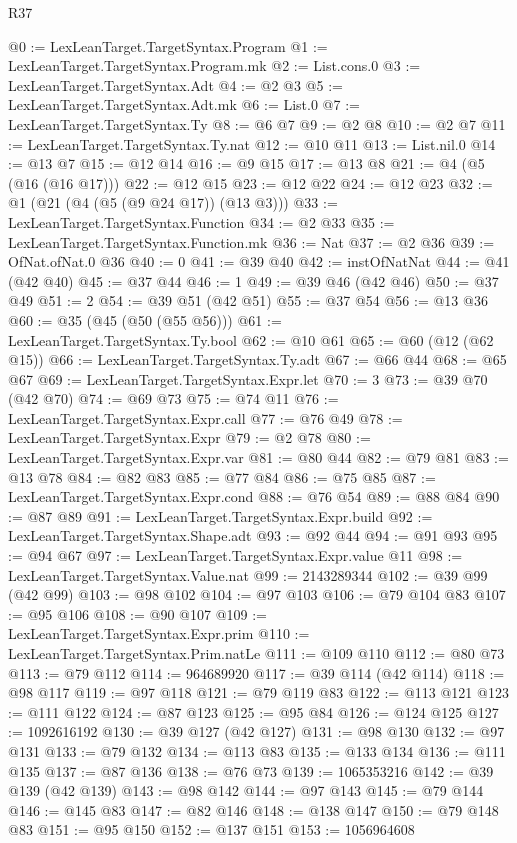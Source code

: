 \begin{lexlean}{R37}
\begin{coremodule}
@0 := LexLeanTarget.TargetSyntax.Program
@1 := LexLeanTarget.TargetSyntax.Program.mk
@2 := List.cons.{0}
@3 := LexLeanTarget.TargetSyntax.Adt
@4 := @2 @3
@5 := LexLeanTarget.TargetSyntax.Adt.mk
@6 := List.{0}
@7 := LexLeanTarget.TargetSyntax.Ty
@8 := @6 @7
@9 := @2 @8
@10 := @2 @7
@11 := LexLeanTarget.TargetSyntax.Ty.nat
@12 := @10 @11
@13 := List.nil.{0}
@14 := @13 @7
@15 := @12 @14
@16 := @9 @15
@17 := @13 @8
@21 := @4 (@5 (@16 (@16 @17)))
@22 := @12 @15
@23 := @12 @22
@24 := @12 @23
@32 := @1 (@21 (@4 (@5 (@9 @24 @17)) (@13 @3)))
@33 := LexLeanTarget.TargetSyntax.Function
@34 := @2 @33
@35 := LexLeanTarget.TargetSyntax.Function.mk
@36 := Nat
@37 := @2 @36
@39 := OfNat.ofNat.{0} @36
@40 := 0
@41 := @39 @40
@42 := instOfNatNat
@44 := @41 (@42 @40)
@45 := @37 @44
@46 := 1
@49 := @39 @46 (@42 @46)
@50 := @37 @49
@51 := 2
@54 := @39 @51 (@42 @51)
@55 := @37 @54
@56 := @13 @36
@60 := @35 (@45 (@50 (@55 @56)))
@61 := LexLeanTarget.TargetSyntax.Ty.bool
@62 := @10 @61
@65 := @60 (@12 (@62 @15))
@66 := LexLeanTarget.TargetSyntax.Ty.adt
@67 := @66 @44
@68 := @65 @67
@69 := LexLeanTarget.TargetSyntax.Expr.let
@70 := 3
@73 := @39 @70 (@42 @70)
@74 := @69 @73
@75 := @74 @11
@76 := LexLeanTarget.TargetSyntax.Expr.call
@77 := @76 @49
@78 := LexLeanTarget.TargetSyntax.Expr
@79 := @2 @78
@80 := LexLeanTarget.TargetSyntax.Expr.var
@81 := @80 @44
@82 := @79 @81
@83 := @13 @78
@84 := @82 @83
@85 := @77 @84
@86 := @75 @85
@87 := LexLeanTarget.TargetSyntax.Expr.cond
@88 := @76 @54
@89 := @88 @84
@90 := @87 @89
@91 := LexLeanTarget.TargetSyntax.Expr.build
@92 := LexLeanTarget.TargetSyntax.Shape.adt
@93 := @92 @44
@94 := @91 @93
@95 := @94 @67
@97 := LexLeanTarget.TargetSyntax.Expr.value @11
@98 := LexLeanTarget.TargetSyntax.Value.nat
@99 := 2143289344
@102 := @39 @99 (@42 @99)
@103 := @98 @102
@104 := @97 @103
@106 := @79 @104 @83
@107 := @95 @106
@108 := @90 @107
@109 := LexLeanTarget.TargetSyntax.Expr.prim
@110 := LexLeanTarget.TargetSyntax.Prim.natLe
@111 := @109 @110
@112 := @80 @73
@113 := @79 @112
@114 := 964689920
@117 := @39 @114 (@42 @114)
@118 := @98 @117
@119 := @97 @118
@121 := @79 @119 @83
@122 := @113 @121
@123 := @111 @122
@124 := @87 @123
@125 := @95 @84
@126 := @124 @125
@127 := 1092616192
@130 := @39 @127 (@42 @127)
@131 := @98 @130
@132 := @97 @131
@133 := @79 @132
@134 := @113 @83
@135 := @133 @134
@136 := @111 @135
@137 := @87 @136
@138 := @76 @73
@139 := 1065353216
@142 := @39 @139 (@42 @139)
@143 := @98 @142
@144 := @97 @143
@145 := @79 @144
@146 := @145 @83
@147 := @82 @146
@148 := @138 @147
@150 := @79 @148 @83
@151 := @95 @150
@152 := @137 @151
@153 := 1056964608

\end{coremodule}
\end{lexlean}
